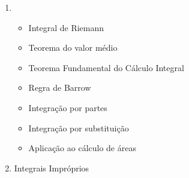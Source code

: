 \documentclass[12pt]{article}
\begin{document}
\begin{multicols}{2}
\begin{enumerate}[label=\arabic*.]
\begin{enumerate}
\begin{itemize}[left = -9mm]
		\end{itemize}
		
		\item \
		\begin{itemize}[left = -9mm]
		
			\item Integral de Riemann
			\item Teorema do valor médio
			\item Teorema Fundamental do Cálculo Integral
			\item Regra de Barrow
			\item Integração por partes
			\item Integração por substituição
			\item Aplicação ao cálculo de áreas
			
		\end{itemize}
		
		\item Integrais Impróprios
		
	\end{enumerate}	
	
\end{enumerate}
\end{multicols}

%
%
%
% 
%
%
%
%
%
%
%
%
%
%
%
%
%
\end{document}

